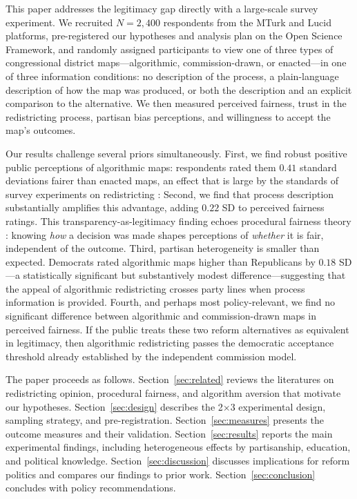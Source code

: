 This paper addresses the legitimacy gap directly with a large-scale survey experiment. We recruited $N = 2{,}400$ respondents from the MTurk and Lucid platforms, pre-registered our hypotheses and analysis plan on the Open Science Framework, and randomly assigned participants to view one of three types of congressional district maps---algorithmic, commission-drawn, or enacted---in one of three information conditions: no description of the process, a plain-language description of how the map was produced, or both the description and an explicit comparison to the alternative. We then measured perceived fairness, trust in the redistricting process, partisan bias perceptions, and willingness to accept the map's outcomes.

Our results challenge several priors simultaneously. First, we find robust positive public perceptions of algorithmic maps: respondents rated them $0.41$ standard deviations fairer than enacted maps, an effect that is large by the standards of survey experiments on redistricting \citep{bonneau2021,elmendorf2019}: Second, we find that process description substantially amplifies this advantage, adding $0.22$ SD to perceived fairness ratings. This transparency-as-legitimacy finding echoes procedural fairness theory \citep{thibaut1975procedural,tyler2006legitimacy}: knowing \textit{how} a decision was made shapes perceptions of \textit{whether} it is fair, independent of the outcome. Third, partisan heterogeneity is smaller than expected. Democrats rated algorithmic maps higher than Republicans by $0.18$ SD---a statistically significant but substantively modest difference---suggesting that the appeal of algorithmic redistricting crosses party lines when process information is provided. Fourth, and perhaps most policy-relevant, we find no significant difference between algorithmic and commission-drawn maps in perceived fairness. If the public treats these two reform alternatives as equivalent in legitimacy, then algorithmic redistricting passes the democratic acceptance threshold already established by the independent commission model.

The paper proceeds as follows. Section~\ref{sec:related} reviews the literatures on redistricting opinion, procedural fairness, and algorithm aversion that motivate our hypotheses. Section~\ref{sec:design} describes the 2$\times$3 experimental design, sampling strategy, and pre-registration. Section~\ref{sec:measures} presents the outcome measures and their validation. Section~\ref{sec:results} reports the main experimental findings, including heterogeneous effects by partisanship, education, and political knowledge. Section~\ref{sec:discussion} discusses implications for reform politics and compares our findings to prior work. Section~\ref{sec:conclusion} concludes with policy recommendations.

